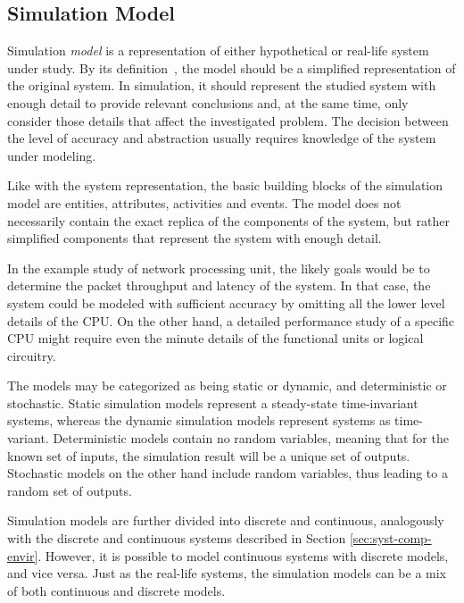 \subsection{Simulation Model}
\label{sec:simulation-model}

Simulation \emph{model} is a representation of either hypothetical or real-life system under study. By its definition~\cite{Encyclopedia of computer science}, the model should be a simplified representation of the original system. In simulation, it should represent the studied system with enough detail to provide relevant conclusions and, at the same time, only consider those details that affect the investigated problem. The decision between the level of accuracy and abstraction usually requires knowledge of the system under modeling.~\cite{Banks:2010:DES}

Like with the system representation, the basic building blocks of the simulation model are entities, attributes, activities and events. The model does not necessarily contain the exact replica of the components of the system, but rather simplified components that represent the system with enough detail.~\cite{Banks:2010:DES}

In the example study of network processing unit, the likely goals would be to determine the packet throughput and latency of the system. In that case, the system could be modeled with sufficient accuracy by omitting all the lower level details of the CPU. On the other hand, a detailed performance study of a specific CPU might require even the minute details of the functional units or logical circuitry.~\cite{TODO: find some simulation example for this}

The models may be categorized as being static or dynamic, and deterministic or stochastic. Static simulation models represent a steady-state time-invariant systems, whereas the dynamic simulation models represent systems as time-variant. Deterministic models contain no random variables, meaning that for the known set of inputs, the simulation result will be a unique set of outputs. Stochastic models on the other hand include random variables, thus leading to a random set of outputs.~\cite{Banks:2010:DES}

Simulation models are further divided into discrete and continuous, analogously with the discrete and continuous systems described in Section \ref{sec:syst-comp-envir}. However, it is possible to model continuous systems with discrete models, and vice versa. Just as the real-life systems, the simulation models can be a mix of both continuous and discrete models.~\cite{Banks:2010:DES}

